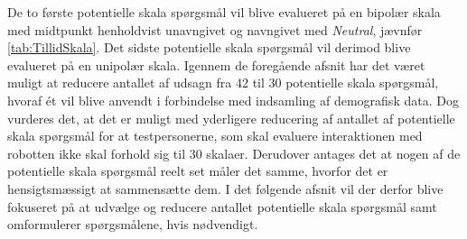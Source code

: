 \noindent
%
De to første potentielle skala spørgsmål vil blive evalueret på en bipolær skala med midtpunkt henholdvist unavngivet og navngivet med \textit{Neutral}, jævnfør \autoref{tab:TillidSkala}. Det sidste potentielle skala spørgsmål vil derimod blive evalueret på en unipolær skala. \blankline
%
Igennem de foregående afsnit har det været muligt at reducere antallet af udsagn fra 42 til 30 potentielle skala spørgsmål, hvoraf ét vil blive anvendt i forbindelse med indsamling af demografisk data. Dog vurderes det, at det er muligt med yderligere reducering af antallet af potentielle skala spørgsmål for at testpersonerne, som skal evaluere interaktionen med robotten ikke skal forhold sig til 30 skalaer. Derudover antages det at nogen af de potentielle skala spørgsmål reelt set måler det samme, hvorfor det er hensigtsmæssigt at sammensætte dem. I det følgende afsnit vil der derfor blive fokuseret på at udvælge og reducere antallet potentielle skala spørgsmål samt omformulerer spørgsmålene, hvis nødvendigt. 
